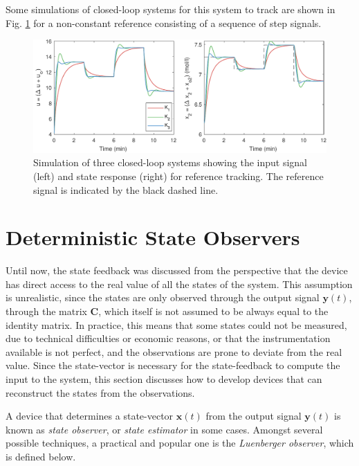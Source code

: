 \documentclass[a4paper,11pt]{book}
\numberwithin{figure}{chapter}
\numberwithin{equation}{chapter}
\numberwithin{table}{chapter}
\theoremstyle{definition}
\begin{document}
Some simulations of closed-loop systems for this system to track are shown in Fig. \ref{fig:tracking03} for a non-constant reference consisting of a sequence of step signals.

\begin{figure}[ht] \centering
    \includegraphics[width=\textwidth]{chapter3/report_ch3_2}
    
    \caption{Simulation of three closed-loop systems showing the input signal (left) and state response (right) for reference tracking. The reference signal is indicated by the black dashed line.}
    \label{fig:tracking03}
\end{figure}


\section{Deterministic State Observers}

Until now, the state feedback was discussed from the perspective that the device has direct access to the real value of all the states of the system. This assumption is unrealistic, since the states are only observed through the output signal $\bm{y}(t)$, through the matrix $\bm{C}$, which itself is not assumed to be always equal to the identity matrix. In practice, this means that some states could not be measured, due to technical difficulties or economic reasons, or that the instrumentation available is not perfect, and the observations are prone to deviate from the real value. Since the state-vector is necessary for the state-feedback to compute the input to the system, this section discusses how to develop devices that can reconstruct the states from the observations.

A device that determines a state-vector $\bm{x}(t)$ from the output signal $\bm{y}(t)$ is known as \textit{state observer}, or \textit{state estimator} in some cases. Amongst several possible techniques, a practical and popular one is the \textit{Luenberger observer}, which is defined below.
\end{document}
